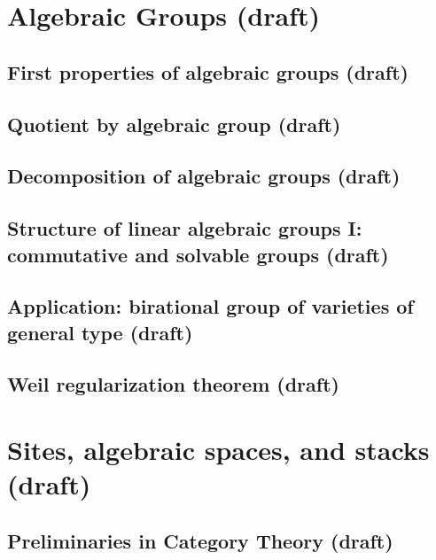 \documentclass[sectionlevel=book]{noteformyself}
\begin{document}
    \chapter{Algebraic Groups (draft)}
        \section{First properties of algebraic groups (draft)}
        
        \section{Quotient by algebraic group (draft)}
        
        \section{Decomposition of algebraic groups (draft)}
        
        \section{Structure of linear algebraic groups I: commutative and solvable groups (draft)}
        
        \section{Application: birational group of varieties of general type (draft)}
        
        \section{Weil regularization theorem (draft)}
        

    \chapter{Sites, algebraic spaces, and stacks (draft)}
        \section{Preliminaries in Category Theory (draft)}
        
\end{document}
